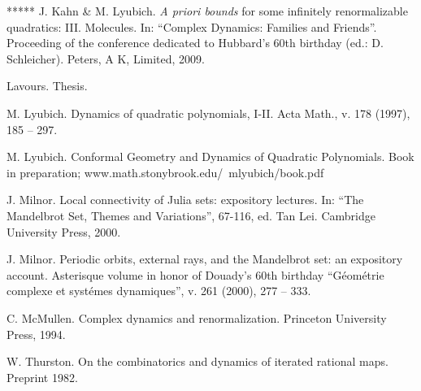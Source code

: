 \begin{thebibliography}{*****}
 J. Kahn \& M. Lyubich. {\it A priori bounds} for some infinitely
renormalizable quadratics: III.  Molecules.  In: ``Complex Dynamics: Families and Friends''.
    Proceeding of the conference dedicated to Hubbard's 60th birthday (ed.:  D. Schleicher). 
    Peters, A K, Limited, 2009. 


 Lavours.  Thesis. 
    

 M. Lyubich. Dynamics of quadratic polynomials, I-II. 
   Acta Math., v. 178 (1997), 185 -- 297.


  M. Lyubich.
   Conformal Geometry and Dynamics of Quadratic Polynomials.
   Book in preparation;
   www.math.stonybrook.edu/~mlyubich/book.pdf

 J. Milnor.
     Local connectivity of Julia sets: expository lectures.
     In: ``The Mandelbrot Set, Themes and Variations'',  67-116, ed. Tan Lei.  
     Cambridge University Press, 2000.

 J. Milnor.
  Periodic orbits, external rays, and the Mandelbrot set: an expository account.
   Asterisque volume in honor of Douady's 60th birthday
 ``G\'eom\'etrie complexe et syst\'emes dynamiques'', 
   v. 261 (2000),  277 -- 333. 

 C. McMullen. Complex dynamics and renormalization.
   Princeton University Press, 1994. 

 W. Thurston. 
  On the combinatorics and dynamics of iterated rational maps.
  Preprint 1982.

\end{thebibliography}
